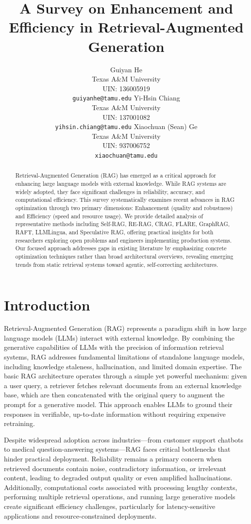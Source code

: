 \documentclass[11pt]{article}
\title{A Survey on Enhancement and Efficiency in Retrieval-Augmented Generation}
\author{
  Guiyan He \\
  Texas A\&M University \\
  UIN: 136005919 \\
  \texttt{guiyanhe@tamu.edu}
  \And
  Yi-Hsin Chiang \\
  Texas A\&M University \\
  UIN: 137001082 \\
  \texttt{yihsin.chiang@tamu.edu}
  \And
  Xiaochuan (Sean) Ge \\
  Texas A\&M University \\
  UIN: 937006752 \\
  \texttt{xiaochuan@tamu.edu}}
\begin{document}
\maketitle
\pagestyle{plain}
\begin{abstract}
Retrieval-Augmented Generation (RAG) has emerged as a critical approach for enhancing large language models with external knowledge. While RAG systems are widely adopted, they face significant challenges in reliability, accuracy, and computational efficiency. This survey systematically examines recent advances in RAG optimization through two primary dimensions: Enhancement (quality and robustness) and Efficiency (speed and resource usage). We provide detailed analysis of representative methods including Self-RAG, RE-RAG, CRAG, FLARE, GraphRAG, RAFT, LLMLingua, and Speculative RAG, offering practical insights for both researchers exploring open problems and engineers implementing production systems. Our focused approach addresses gaps in existing literature by emphasizing concrete optimization techniques rather than broad architectural overviews, revealing emerging trends from static retrieval systems toward agentic, self-correcting architectures.
\end{abstract}

\section{Introduction}

Retrieval-Augmented Generation (RAG) represents a paradigm shift in how large language models (LLMs) interact with external knowledge. By combining the generative capabilities of LLMs with the precision of information retrieval systems, RAG addresses fundamental limitations of standalone language models, including knowledge staleness, hallucination, and limited domain expertise. The basic RAG architecture operates through a simple yet powerful mechanism: given a user query, a retriever fetches relevant documents from an external knowledge base, which are then concatenated with the original query to augment the prompt for a generative model. This approach enables LLMs to ground their responses in verifiable, up-to-date information without requiring expensive retraining.

Despite widespread adoption across industries—from customer support chatbots to medical question-answering systems—RAG faces critical bottlenecks that hinder practical deployment. Reliability remains a primary concern when retrieved documents contain noise, contradictory information, or irrelevant content, leading to degraded output quality or even amplified hallucinations. Additionally, computational costs associated with processing lengthy contexts, performing multiple retrieval operations, and running large generative models create significant efficiency challenges, particularly for latency-sensitive applications and resource-constrained deployments.
\end{document}
